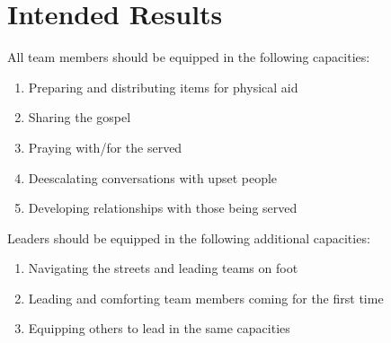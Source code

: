 
\section{Intended Results}

    All team members should be equipped in the following capacities:
    \begin{enumerate}
        \item Preparing and distributing items for physical aid
        \item Sharing the gospel
        \item Praying with/for the served
        \item Deescalating conversations with upset people
        \item Developing relationships with those being served
    \end{enumerate}

    Leaders should be equipped in the following additional capacities:
    \begin{enumerate}
        \item Navigating the streets and leading teams on foot
        \item Leading and comforting team members coming for the first time
        \item Equipping others to lead in the same capacities
    \end{enumerate}

